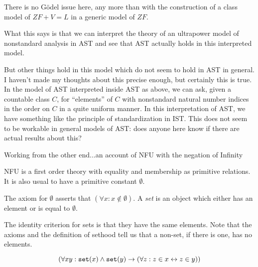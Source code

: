 \documentclass{slides}
\begin{document}
\begin{slide}

There is no G\"odel issue here, any more than with the construction of a class model of $ZF+V=L$ in a generic model of $ZF$.

What this says is that we can interpret the theory of an ultrapower model of nonstandard analysis in AST and see that AST actually holds in this interpreted model.

But other things hold in this model which do not seem to hold in AST in general.  I haven't made my thoughts about this precise enough, but certainly this is true.  In the model of AST interpreted inside AST as above, we can ask,
given a countable class $C$, for ``elements'' of $C$ with nonstandard natural number indices in the order on $C$ in a quite uniform manner.  In this interpretation of AST, we have something like the principle of standardization in IST.  This does not seem to be workable in general models of AST:  does anyone here know if there are actual results about this?


\end{slide}

\begin{slide}

{\Large Working from the other end...an account of NFU with the negation of Infinity}

NFU is a first order theory with equality and membership as primitive relations.  It is also usual to have a primitive constant $\emptyset$.

The axiom for $\emptyset$ asserts that $(\forall x:x \not\in \emptyset)$.  A {\em set\/} is an object which either has an element or is equal to $\emptyset$.

The identity criterion for sets is that they have the same elements.  Note that the axioms and the definition of sethood tell us that a non-set, if there is one, has no elements.

$$(\forall xy:  {\tt set}(x) \wedge {\tt set}(y) \rightarrow (\forall z:z \in x \leftrightarrow z \in y))$$

\end{slide}
\end{document}
